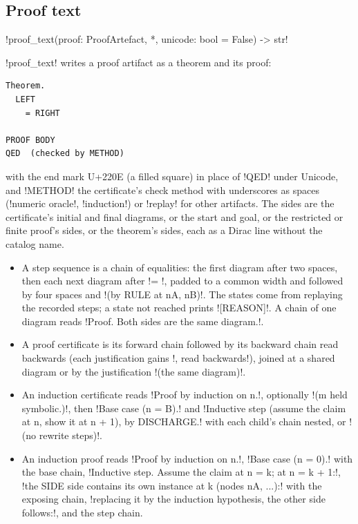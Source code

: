 \subsection{Proof text}\label{sec:language-proof-text}

\begin{signature}
\py!proof_text(proof: ProofArtefact, *, unicode: bool = False) -> str!
\end{signature}
\py!proof_text! writes a proof artifact as a theorem and its proof:
\begin{lstlisting}[style=grammar]
Theorem.
  LEFT
    = RIGHT

PROOF BODY
QED  (checked by METHOD)
\end{lstlisting}
with the end mark U+220E (a filled square) in place of \code!QED! under Unicode, and \code!METHOD! the certificate's check method with underscores as spaces (\code!numeric oracle!, \code!induction!) or \code!replay! for other artifacts. The sides are the certificate's initial and final diagrams, or the start and goal, or the restricted or finite proof's sides, or the theorem's sides, each as a Dirac line without the catalog name.
\begin{itemize}
\item A step sequence is a chain of equalities: the first diagram after two spaces, then each next diagram after \code!= !, padded to a common width and followed by four spaces and \code!(by RULE at nA, nB)!. The states come from replaying the recorded steps; a state not reached prints \code![REASON]!. A chain of one diagram reads \code!Proof. Both sides are the same diagram.!.
\item A proof certificate is its forward chain followed by its backward chain read backwards (each justification gains \code!, read backwards!), joined at a shared diagram or by the justification \code!(the same diagram)!.
\item An induction certificate reads \code!Proof by induction on n.!, optionally \code!(m held symbolic.)!, then \code!Base case (n = B).! and \code!Inductive step (assume the claim at n, show it at n + 1), by DISCHARGE.! with each child's chain nested, or \code!(no rewrite steps)!.
\item An induction proof reads \code!Proof by induction on n.!, \code!Base case (n = 0).! with the base chain, \code!Inductive step. Assume the claim at n = k; at n = k + 1:!, \code!the SIDE side contains its own instance at k (nodes nA, ...):! with the exposing chain, \code!replacing it by the induction hypothesis, the other side follows:!, and the step chain.
\end{itemize}

